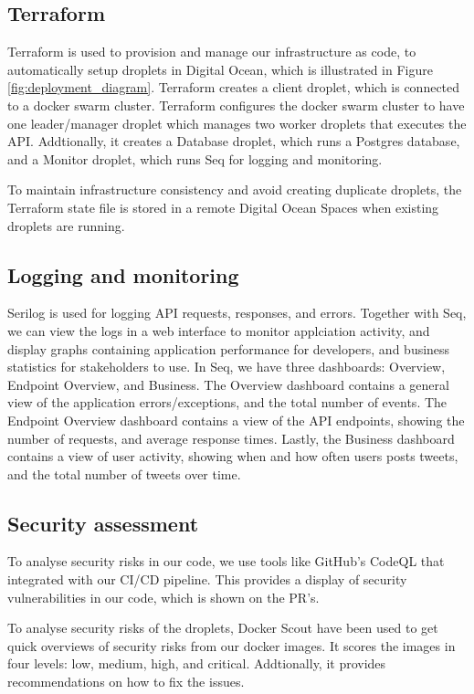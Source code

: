 \subsection{Terraform}
Terraform is used to provision and manage our infrastructure as code, 
to automatically setup droplets in Digital Ocean, which is illustrated 
in Figure \ref{fig:deployment_diagram}.
Terraform creates a client droplet, which is connected to a docker swarm cluster.
Terraform configures the docker swarm cluster to have one leader/manager droplet 
which manages two worker droplets that executes the API.
Addtionally, it creates a Database droplet, which runs a Postgres database,
and a Monitor droplet, which runs Seq for logging and monitoring.

To maintain infrastructure consistency and avoid creating duplicate droplets, 
the Terraform state file is stored in a remote Digital Ocean Spaces when
existing droplets are running.

\subsection{Logging and monitoring}
Serilog is used for logging API requests, responses, and errors.
Together with Seq, we can view the logs in a web interface to monitor 
applciation activity, and display graphs containing application performance 
for developers, and business statistics for stakeholders to use.
In Seq, we have three dashboards: Overview, Endpoint Overview, and Business.
The Overview dashboard contains a general view of the application 
errors/exceptions, and the total number of events.
The Endpoint Overview dashboard contains a view of the API endpoints,
showing the number of requests, and average response times.
Lastly, the Business dashboard contains a view of user activity,
showing when and how often users posts tweets, and the total number of tweets over time.


\subsection{Security assessment}
To analyse security risks in our code, we use tools like GitHub's CodeQL\cite{codeql} that 
integrated with our CI/CD pipeline.
This provides a display of security vulnerabilities in our code,
which is shown on the PR's.

To analyse security risks of the droplets, Docker Scout have been used to get
quick overviews of security risks from our docker images.
It scores the images in four levels: low, medium, high, and critical.
Addtionally, it provides recommendations on how to fix the issues.



